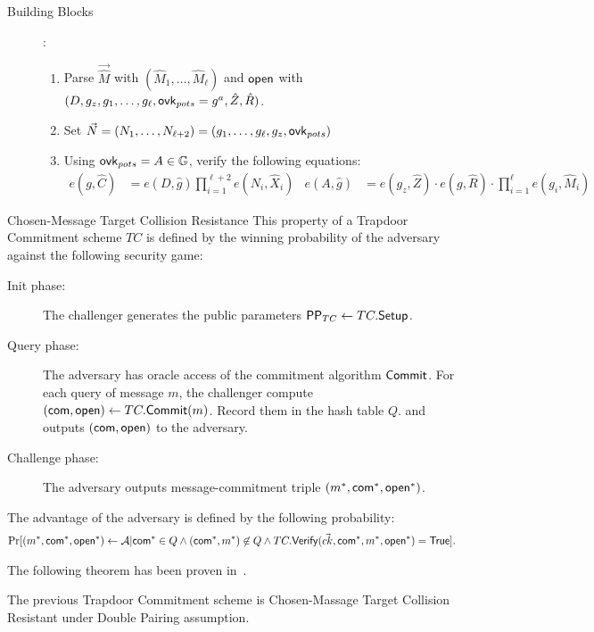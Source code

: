 \begin{subsection}{Building Blocks}
\begin{description}
  \item[] :
    \begin{enumerate}
    \item Parse $\vec{\hat{M}}$ with $(\hat{M}_1, \dots, \hat{M}_\ell)$ and $\mathsf{open}$ with $(D, g_z, g_1, \dots, g_\ell, \mathsf{ovk}_{pots} = g^a, \hat{Z}, \hat{R})$.
    \item Set $\vec{N} = (N_1, \dots, N_{\ell+2}) = (g_1, \dots, g_\ell, g_z, \mathsf{ovk}_{pots})$
    \item Using $\mathsf{ovk}_{pots} = A \in \mathbb{G}$, verify the following equations:
      \begin{align*}
	e(g, \hat{C}) &= e(D, \hat{g}) \prod_{i = 1}^{\ell+2} e(N_i, \hat{X}_i) & e(A, \hat{g}) &= e(g_z, \hat{Z}) \cdot e(g, \hat{R}) \cdot \prod_{i = 1}^\ell e(g_i, \hat{M}_i) 
      \end{align*}
    \end{enumerate}
  \end{description}

  \begin{myDef}{Chosen-Message Target Collision Resistance} This property of a Trapdoor Commitment scheme $TC$ is defined by the winning probability of the adversary against the following security game:
    \begin{description}
    \item[Init phase:] The challenger generates the public parameters $\mathsf{PP}_{TC} \gets TC.{\mathsf{Setup}}$.
    \item[Query phase:] The adversary has oracle access of the commitment algorithm ${\mathsf{Commit}}$. For each query of message $m$, the challenger compute $(\mathsf{com}, \mathsf{open}) \gets TC.{\mathsf{Commit}}(m)$. Record them in the hash table $Q$. and outputs $(\mathsf{com}, \mathsf{open})$ to the adversary.
    \item[Challenge phase:] The adversary outputs message-commitment triple $(m^*, \mathsf{com}^*, \mathsf{open}^*)$.
    \end{description}
    The advantage of the adversary is defined by the following probability:
    \begin{align*}
      \operatorname{Pr}[(m^*, \mathsf{com}^*, \mathsf{open}^*) \gets \mathcal{A} | \mathsf{com}^* \in Q \wedge (\mathsf{com}^*, m^*) \not \in Q \wedge TC.{\mathsf{Verify}}(\vec{ck}, \mathsf{com}^*, m^*, \mathsf{open}^*) = \mathsf{True}].
    \end{align*}
  \end{myDef}

  The following theorem has been proven in~\cite{DBLP:conf/eurocrypt/AbeKOT15}.

  \begin{myTh}
    The previous Trapdoor Commitment scheme is Chosen-Massage Target Collision Resistant under Double Pairing assumption.
  \end{myTh}

  

\end{subsection}


